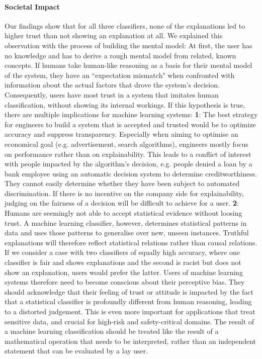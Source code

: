 \paragraph{Societal Impact}
Our findings show that for all three classifiers, none of the explanations led to higher trust than not showing an explanation at all. We explained this observation with the process of building the mental model: At first, the user has no knowledge and has to derive a rough mental model from related, known concepts. If humans take human-like reasoning as a basis for their mental model of the system, they have an ``expectation mismatch" when confronted with information about the actual factors that drove the system's decision. Consequently, users have most trust in a system that imitates human classification, without showing its internal workings.\newline
If this hypothesis is true, there are multiple implications for machine learning systems:\newline
\textbf{1}: The best strategy for engineers to build a system that is accepted and trusted would be to optimize accuracy and suppress transparency. Especially when aiming to optimise an economical goal (e.g. advertisement, search algorithms), engineers mostly focus on performance rather than on explainability. This leads to a conflict of interest with people impacted by the algorithm's decision, e.g. people denied a loan by a bank employee using an automatic decision system to determine creditworthiness. They cannot easily determine whether they have been subject to automated discrimination. If there is no incentive on the company side for explainability, judging on the fairness of a decision will be difficult to achieve for a user.\newline
\textbf{2}: Humans are seemingly not able to accept statistical evidence without loosing trust. A machine learning classifier, however, determines statistical patterns in data and uses those patterns to generalise over new, unseen instances. Truthful explanations will therefore reflect statistical relations rather than causal relations. If we consider a case with two classifiers of equally high accuracy, where one classifier is fair and shows explanations and the second is racist but does not show an explanation, users would prefer the latter. Users of machine learning systems therefore need to become conscious about their perceptive bias. They should acknowledge that their feeling of trust or attitude is impacted by the fact that a statistical classifier is profoundly different from human reasoning, leading to a distorted judgement. This is even more important for applications that treat sensitive data, and crucial for high-risk and safety-critical domains. The result of a machine learning classification should be treated like the result of a mathematical operation that needs to be interpreted, rather than an independent statement that can be evaluated by a lay user.\newline
